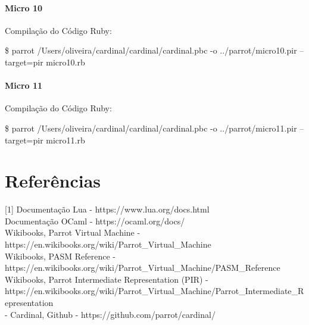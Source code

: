 \documentclass[12pt,a4paper,twoside]{report}
\begin{document}
\subsubsection{Micro 10}


Compilação do Código Ruby:
\begin{terminal}
\$ parrot /Users/oliveira/cardinal/cardinal/cardinal.pbc -o
../parrot/micro10.pir --target=pir micro10.rb
\end{terminal}


\subsubsection{Micro 11}


Compilação do Código Ruby:
\begin{terminal}
\$ parrot /Users/oliveira/cardinal/cardinal/cardinal.pbc -o
../parrot/micro11.pir --target=pir micro11.rb
\end{terminal}




\chapter{Referências}
[1] Documentação Lua - https://www.lua.org/docs.html \\
[2] Documentação OCaml - https://ocaml.org/docs/ \\
[3] Wikibooks, Parrot Virtual Machine - https://en.wikibooks.org/wiki/Parrot_Virtual_Machine \\
[4] Wikibooks, PASM Reference -
https://en.wikibooks.org/wiki/Parrot_Virtual_Machine/PASM_Reference \\
[5] Wikibooks, Parrot Intermediate Representation (PIR) -
https://en.wikibooks.org/wiki/Parrot_Virtual_Machine/Parrot_Intermediate_Representation
\\
[6] - Cardinal, Github - https://github.com/parrot/cardinal/ \\

\clearpage
{}
\appendix
\end{document}
